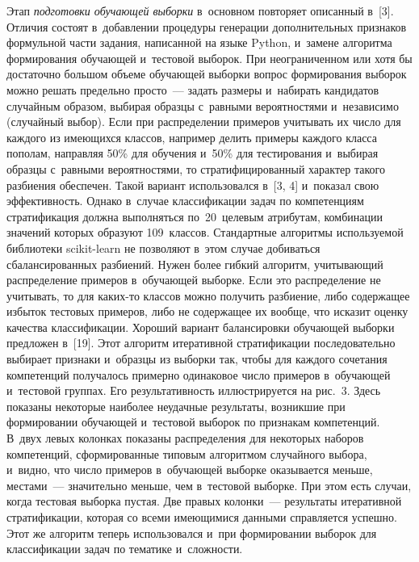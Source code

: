 \begin{multicols}{2}
      Этап \textit{подготовки обучающей выборки} в~основном повторяет 
описанный в~[3]. Отличия состоят в~добавлении процедуры генерации 
дополнительных признаков формульной части задания, написанной на языке 
Python, и~замене алгоритма формирования обучающей и~тестовой выборок. 
При неограниченном или хотя бы достаточно большом объеме обучающей 
выборки вопрос формирования выборок можно решать предельно просто~--- 
задать размеры и~набирать кандидатов случайным образом, выбирая образцы 
с~равными вероятностями и~независимо (случайный выбор). Если при 
распределении примеров учитывать их число для каждого из имеющихся 
классов, например делить примеры каждого класса пополам, направляя 50\% 
для обучения и~50\% для тестирования и~выбирая образцы с~равными 
вероятностями, то стратифицированный характер такого разбиения 
обеспечен. Такой вариант использовался в~[3, 4] и~показал свою 
эффективность. Однако в~случае классификации задач по компетенциям 
стратификация должна выполняться по~20~целевым атрибутам, комбинации 
значений которых образуют 109~классов. Стандартные алгоритмы 
используемой библиотеки scikit-learn не позволяют в~этом случае добиваться 
сбалансированных разбиений. Нужен более гибкий алгоритм, учитывающий 
распределение примеров в~обуча\-ющей выборке. Если это распределение не 
учитывать, то для ка\-ких-то классов можно получить разбиение, либо 
содержащее избыток тес\-то\-вых примеров, либо не содержащее их вообще, что 
исказит оценку качества классификации. Хороший вариант балансировки 
обучающей выборки предложен в~[19]. Этот алгоритм итеративной 
стратификации последовательно выбирает признаки и~образцы из выборки 
так, чтобы для каждого сочетания компетенций получалось примерно 
одинаковое число примеров в~обучающей и~тестовой группах. Его 
результативность иллюстрируется на рис.~3. Здесь показаны некоторые 
наиболее неудачные результаты, возникшие при формировании обучающей 
и~тестовой выборок по признакам компетенций. В~двух левых колонках 
показаны распределения для некоторых наборов компетенций, 
сформированные типовым алгоритмом случайного выбора, и~видно, что 
число примеров в~обучающей выборке оказывается меньше, местами~--- 
значительно меньше, чем в~тестовой выборке. При этом есть случаи, когда 
тестовая выборка пустая. Две правых колонки~--- результаты итеративной 
стратификации, которая со всеми име\-ющи\-ми\-ся данными справляется 
успешно. Этот же алгоритм теперь использовался и~при формировании 
выборок для классификации задач по тематике и~слож\-ности.




\end{multicols}
